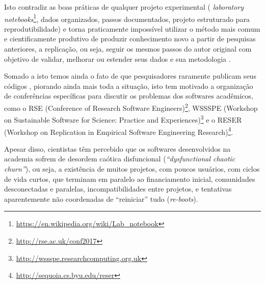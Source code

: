 Isto contradiz as boas práticas de qualquer projeto experimental ({\it
laboratory
notebooks}\footnote{\url{https://en.wikipedia.org/wiki/Lab_notebook}}, dados
organizados, passos documentados, projeto estruturado para reprodutibilidade) e
torna praticamente impossível utilizar o método mais comum e cientificamente
produtivo de produzir conhecimento novo a partir de pesquisas anteriores, a
replicação, ou seja, seguir os mesmos passos do autor original com objetivo de
validar, melhorar ou estender seus dados e sua metodologia
\cite{king1995replication, stodden2010reproducible}.

Somado a isto temos ainda o fato de que pesquisadores raramente publicam seus
códigos \cite{robles2010replicating, amann2015software}, piorando ainda mais toda a situação, isto tem motivado a organização
de conferências específicas para discutir os problemas dos softwares
acadêmicos, como o RSE (Conference of Research Software Engineers)\footnote{
\url{http://rse.ac.uk/conf2017}}, WSSSPE (Workshop on Sustainable Software for
Science: Practice and Experiences)\footnote{
\url{http://wssspe.researchcomputing.org.uk}} e o RESER (Workshop on
Replication in Empirical Software Engineering Research)\footnote{
\url{http://sequoia.cs.byu.edu/reser}}.
%

%


Apesar disso, cientistas têm percebido que os softwares desenvolvidos na academia 
sofrem de desordem caótica disfuncional ({\it ``dysfunctional chaotic churn''}), 
ou seja, a existência
de muitos projetos, com poucos usuários, com ciclos de vida curtos, que
terminam em paralelo ao financiamento inicial, comunidades desconectadas e
paralelas, incompatibilidades entre projetos, e tentativas aparentemente não
coordenadas de ``reiniciar'' tudo ({\it re-boots}).

